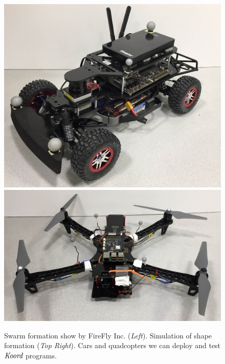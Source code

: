 \begin{figure}[htb!]
\begin{minipage}{0.55\columnwidth}
	\includegraphics[width=0.42\linewidth]{figs/car.jpg}
	\includegraphics[width=0.56\linewidth]{figs/quad.jpg}
\end{minipage}%
	\caption{
        Swarm formation show by FireFly Inc. (\emph{Left}).
        Simulation of shape formation (\emph{Top Right}).
        Cars and quadcopters we can deploy and test $\emph{Koord}$ programs.}
    \label{fig:firefly}
\end{figure}



